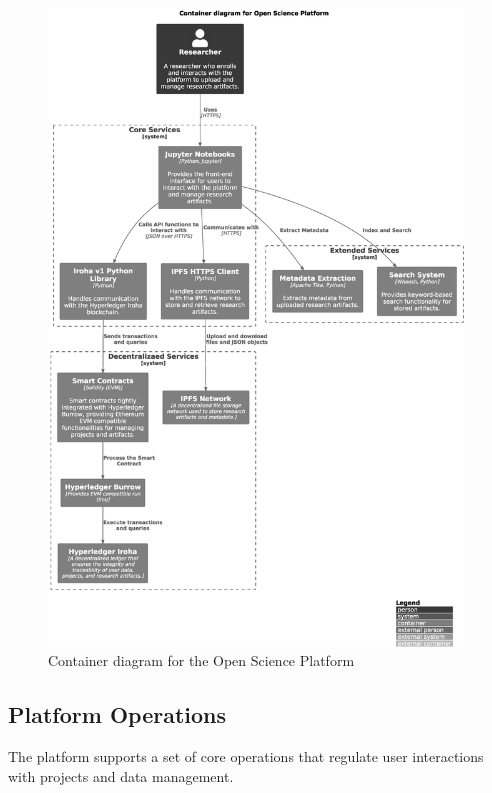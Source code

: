 \documentclass{article}
\begin{document}
\begin{figure}[htbp]
      \centering
      \includegraphics[width=0.98\textwidth, keepaspectratio]{c4_container_diagram}
      \caption{Container diagram for the Open Science Platform}
      \label{fig:c4_container_diagram}
\end{figure}



\subsection{Platform Operations}
The platform supports a set of core operations that regulate user interactions with projects and data management.
\end{document}
